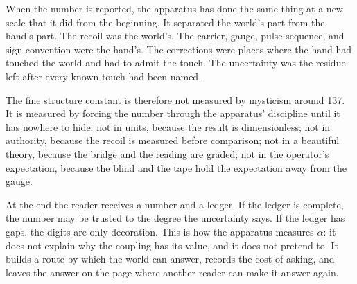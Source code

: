 When the number is reported, the apparatus has done the same thing at a new scale that it did from the beginning.
It separated the world's part from the hand's part. The recoil was the world's. The carrier, gauge, pulse
sequence, and sign convention were the hand's. The corrections were places where the hand had touched the world
and had to admit the touch. The uncertainty was the residue left after every known touch had been named.

The fine structure constant is therefore not measured by mysticism around 137. It is measured by forcing the
number through the apparatus' discipline until it has nowhere to hide: not in units, because the result is
dimensionless; not in authority, because the recoil is measured before comparison; not in a beautiful theory,
because the bridge and the reading are graded; not in the operator's expectation, because the blind and the tape
hold the expectation away from the gauge.

At the end the reader receives a number and a ledger. If the ledger is complete, the number may be trusted to the
degree the uncertainty says. If the ledger has gaps, the digits are only decoration. This is how the apparatus
measures \(\alpha\): it does not explain why the coupling has its value, and it does not pretend to. It builds a
route by which the world can answer, records the cost of asking, and leaves the answer on the page where another
reader can make it answer again.
